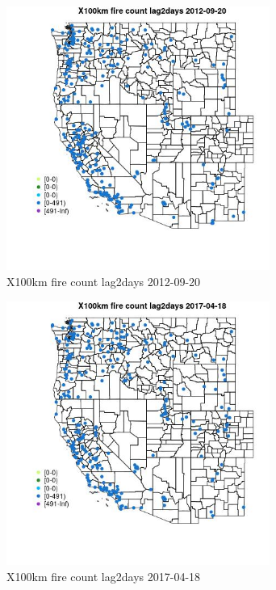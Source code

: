 \begin{figure} 
\centering  
\includegraphics[width=0.77\textwidth]{Code_Outputs/Report_ML_input_PM25_Step4_part_e_de_duplicated_aves_compiled_2019-05-14wNAs_MapObsX100km_fire_count_lag2days2012-09-20.jpg} 
\caption{\label{fig:Report_ML_input_PM25_Step4_part_e_de_duplicated_aves_compiled_2019-05-14wNAsMapObsX100km_fire_count_lag2days2012-09-20}X100km fire count lag2days 2012-09-20} 
\end{figure} 
 

\begin{figure} 
\centering  
\includegraphics[width=0.77\textwidth]{Code_Outputs/Report_ML_input_PM25_Step4_part_e_de_duplicated_aves_compiled_2019-05-14wNAs_MapObsX100km_fire_count_lag2days2017-04-18.jpg} 
\caption{\label{fig:Report_ML_input_PM25_Step4_part_e_de_duplicated_aves_compiled_2019-05-14wNAsMapObsX100km_fire_count_lag2days2017-04-18}X100km fire count lag2days 2017-04-18} 
\end{figure} 
 

